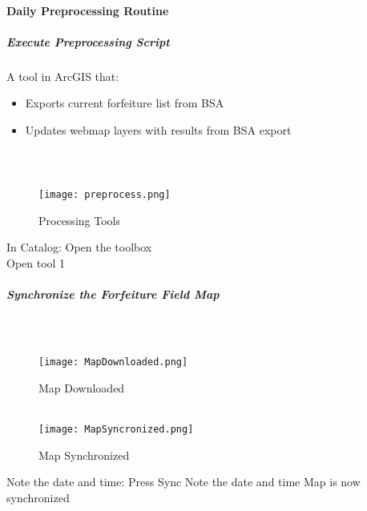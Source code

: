 \documentclass[class=article , crop=false, titlepage, twoside, multi={itemize, figure, verbatim}, float=false]{standalone}
\begin{document}
\paragraph{Daily Preprocessing Routine}
\subparagraph{Execute Preprocessing Script}A tool in ArcGIS that:
\begin{itemize}
\item Exports current forfeiture list from BSA
\item Updates webmap layers with results from BSA export
\end{itemize}
\subparagraph*{\\}
\begin{wrapfigure}{r}{0.75\textwidth}
\centering
\texttt{[image: preprocess.png]}
\caption{Processing Tools}
\end{wrapfigure}
In Catalog:
\vspace{1in}
\noindent Open the toolbox\\
\vspace{1in}
\noindent Open tool 1\\
\clearpage
\subparagraph{Synchronize the Forfeiture Field Map\\}
\subparagraph*{\texorpdfstring{\\}{}}
\begin{wrapfigure}{r}{0.5\textwidth}
\centering
\texttt{[image: MapDownloaded.png]}
\caption{Map Downloaded}
\vspace{.25in}
\HRule \\[.4cm] %
\vspace{.25in}
\texttt{[image: MapSyncronized.png]}
\caption{Map Synchronized}
\end{wrapfigure}
\Large Note the date and time:
\vspace{1.5in}
\noindent Press \Large Sync
\vspace{1.5in}
\Large Note the date and time
\vspace{1.5in}
Map is now synchronized
\clearpage
\end{document}
